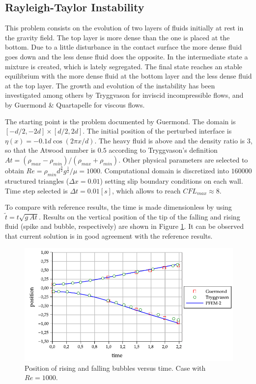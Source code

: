 \documentclass[a4paper,conference]{IEEEtran}
\begin{document}
\subsection{Rayleigh-Taylor Instability}

This problem consists on the evolution of two layers of fluids initially at rest in the gravity field. The top layer is more dense than the one is placed at the bottom. Due to a little disturbance in the contact surface the more dense fluid goes down and the less dense fluid does the opposite. In the intermediate state a mixture is created, which is lately segregated. The final state reaches an stable equilibrium with the more dense fluid at the bottom layer and the less dense fluid at the top layer. The growth and evolution of the instability has been investigated among others by Tryggvason\cite{Tryggvason88} for inviscid incompressible flows, and by Guermond
\& Quartapelle\cite{Guermond00} for viscous flows.

The starting point is the problem documented by Guermond. The domain is $[−d/2,-2d]\times[d/2,2d]$. The initial position of the perturbed interface is $\eta(x) = −0.1d \cos(2\pi x/d)$. The heavy fluid is above and the density ratio is $3$, so that the Atwood
number is $0.5$ according to Tryggvason's definition $At = (\rho_{max}-\rho_{min})/(\rho_{max}+\rho_{min})$. Other physical parameters are selected to obtain $Re=\rho_{min}d^{\frac{3}{2}}g^{\frac{1}{2}}/\mu=1000$. Computational domain is discretized into $160000$ structured triangles ($\Delta x=0.01$) setting slip boundary conditions on each wall. Time step selected is $\Delta t=0.01[s]$, which allows to reach $CFL_{max} \approx 8$.

To compare with reference results, the time is made dimensionless by using $\widetilde{t} = t\sqrt{g\ At}$. Results on the vertical position of the tip of the falling and rising fluid (spike and bubble, respectively) are shown in Figure \ref{fg:rayleigh-rf}. It can be observed that current solution is in good agreement with the reference results.

\begin{figure}[htbp]
  \begin{center}
      \includegraphics[width=\columnwidth]{images/rayleigh_1.pdf}
  \end{center}
  \caption{\label{fg:rayleigh-rf} Position of rising and falling bubbles versus time. Case with $Re=1000$.}
\end{figure}
\end{document}
